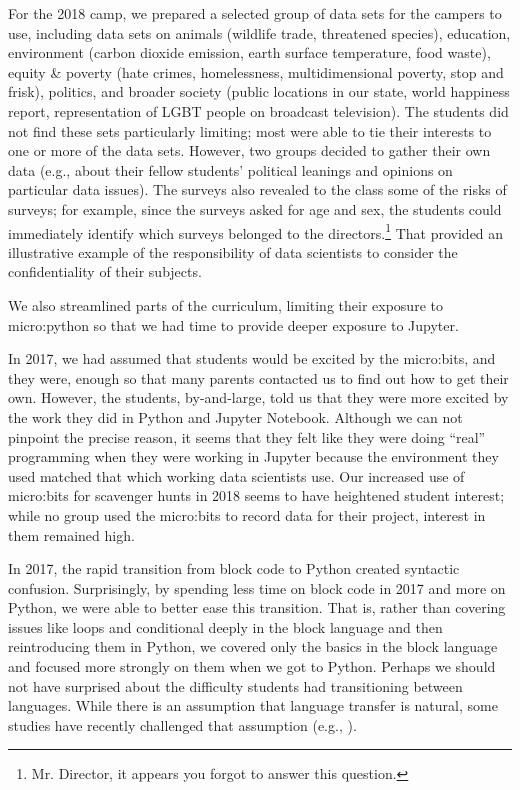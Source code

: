For the 2018 camp, we prepared a selected group of data sets for
the campers to use, including data sets on animals (wildlife trade,
threatened species), education, environment (carbon dioxide emission,
earth surface temperature, food waste), equity \& poverty (hate crimes,
homelessness, multidimensional poverty, stop and frisk), politics,
and broader society (public locations in our state, world happiness
report, representation of LGBT people on broadcast television).
The students did not find these sets particularly limiting; most
were able to tie their interests to one or more of the data sets.
However, two groups decided to gather their own data (e.g., about
their fellow students' political leanings and opinions on particular
data issues).  The surveys also revealed to the class some of the
risks of surveys; for example, since the surveys asked for age and
sex, the students could immediately identify which surveys belonged
to the directors.\footnote{Mr. Director, it appears you forgot to
answer this question.}  That provided an illustrative example of
the responsibility of data scientists to consider the confidentiality
of their subjects.

We also streamlined parts of the curriculum, limiting their exposure
to micro:python so that we had time to provide deeper exposure to Jupyter.

In 2017, we had assumed that students would be excited by the
micro:bits, and they were, enough so that many parents contacted
us to find out how to get their own.  However, the students,
by-and-large, told us that they were more excited by the work they
did in Python and Jupyter Notebook.  Although we can not pinpoint
the precise reason, it seems that they felt like they were doing
``real'' programming when they were working in Jupyter because the
environment they used matched that which working data scientists
use.  Our increased use of micro:bits for scavenger hunts in 2018
seems to have heightened student interest; while no group used the
micro:bits to record data for their project, interest in them
remained high.

In 2017, the rapid transition from block code to Python created
syntactic confusion.  Surprisingly, by spending less time on block
code in 2017 and more on Python, we were able to better ease this
transition.  That is, rather than covering issues like loops and
conditional deeply in the block language and then reintroducing
them in Python, we covered only the basics in the block language
and focused more strongly on them when we got to Python.  Perhaps
we should not have surprised about the difficulty students had
transitioning between languages.  While there is an assumption that
language transfer is natural, some studies have recently challenged
that assumption (e.g., \cite{Chetty12,Dann12}).

